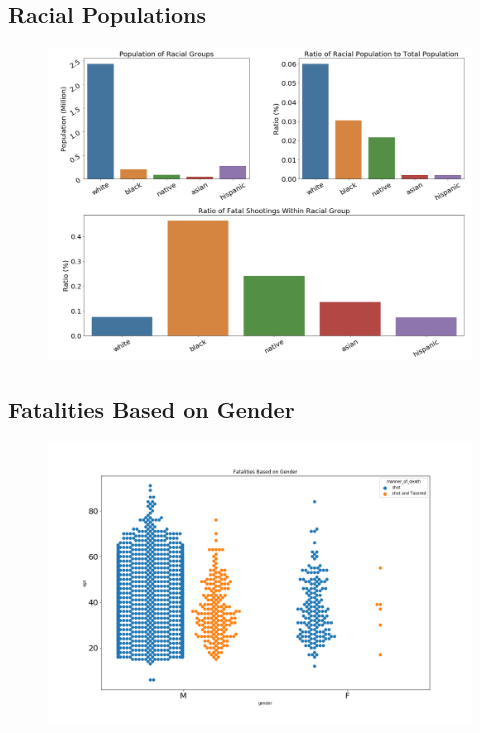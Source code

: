 \documentclass[a4paper,12pt]{article}
\begin{document}
\subsection{Racial Populations}
\begin{figure}[hbt!]
    \centering
    \includegraphics[width=1.0\textwidth]{populaton_ratios.png}
    \caption{}
\end{figure}
\FloatBarrier

\subsection{Fatalities Based on Gender}
\begin{figure}[hbt!]
    \centering
    \includegraphics[width=1.0\textwidth]{swarm_plot_death.png}
    \caption{}
\end{figure}
\FloatBarrier
\end{document}
